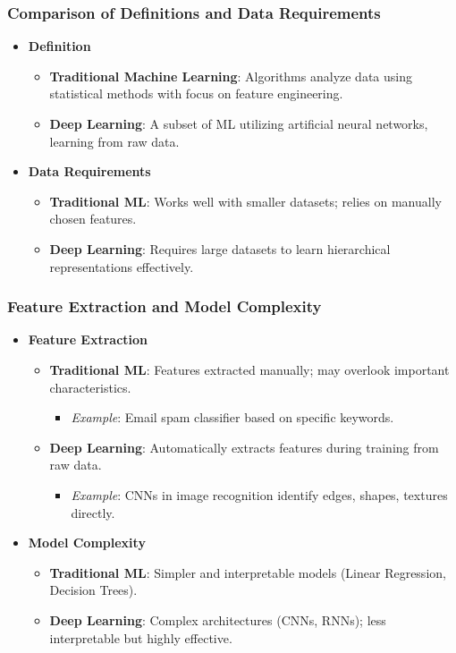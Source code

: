 \documentclass[aspectratio=169]{beamer}
\begin{document}
\begin{frame}[fragile]
    \frametitle{Comparison of Definitions and Data Requirements}
    \begin{itemize}
        \item \textbf{Definition}
        \begin{itemize}
            \item \textbf{Traditional Machine Learning}: Algorithms analyze data using statistical methods with focus on feature engineering.
            \item \textbf{Deep Learning}: A subset of ML utilizing artificial neural networks, learning from raw data.
        \end{itemize}
        \item \textbf{Data Requirements}
        \begin{itemize}
            \item \textbf{Traditional ML}: Works well with smaller datasets; relies on manually chosen features.
            \item \textbf{Deep Learning}: Requires large datasets to learn hierarchical representations effectively.
        \end{itemize}
    \end{itemize}
\end{frame}

\begin{frame}[fragile]
    \frametitle{Feature Extraction and Model Complexity}
    \begin{itemize}
        \item \textbf{Feature Extraction}
        \begin{itemize}
            \item \textbf{Traditional ML}: Features extracted manually; may overlook important characteristics. 
            \begin{itemize}
                \item \textit{Example}: Email spam classifier based on specific keywords.
            \end{itemize}
            \item \textbf{Deep Learning}: Automatically extracts features during training from raw data.
            \begin{itemize}
                \item \textit{Example}: CNNs in image recognition identify edges, shapes, textures directly.
            \end{itemize}
        \end{itemize}
        \item \textbf{Model Complexity}
        \begin{itemize}
            \item \textbf{Traditional ML}: Simpler and interpretable models (Linear Regression, Decision Trees).
            \item \textbf{Deep Learning}: Complex architectures (CNNs, RNNs); less interpretable but highly effective.
        \end{itemize}
    \end{itemize}
\end{frame}
\end{document}
